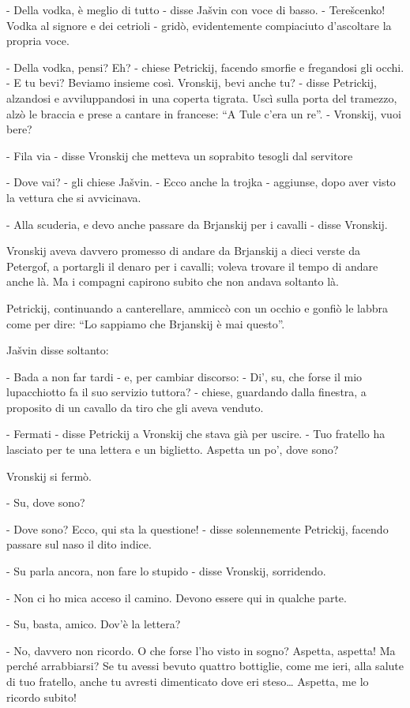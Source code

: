 - Della vodka, è meglio di tutto - disse Jašvin con voce di basso. - Terešcenko! Vodka al signore e dei cetrioli - gridò, evidentemente compiaciuto d'ascoltare la propria voce. 

- Della vodka, pensi? Eh? - chiese Petrickij, facendo smorfie e fregandosi gli occhi. - E tu bevi? Beviamo insieme così. Vronskij, bevi anche tu? - disse Petrickij, alzandosi e avviluppandosi in una coperta tigrata. Uscì sulla porta del tramezzo, alzò le braccia e prese a cantare in francese: ``A Tule c'era un re''. - Vronskij, vuoi bere? 

- Fila via - disse Vronskij che metteva un soprabito tesogli dal servitore 

- Dove vai? - gli chiese Jašvin. - Ecco anche la trojka - aggiunse, dopo aver visto la vettura che si avvicinava. 

- Alla scuderia, e devo anche passare da Brjanskij per i cavalli - disse Vronskij. 

Vronskij aveva davvero promesso di andare da Brjanskij a dieci verste da Petergof, a portargli il denaro per i cavalli; voleva trovare il tempo di andare anche là. Ma i compagni capirono subito che non andava soltanto là. 

Petrickij, continuando a canterellare, ammiccò con un occhio e gonfiò le labbra come per dire: ``Lo sappiamo che Brjanskij è mai questo''. 

Jašvin disse soltanto: 

- Bada a non far tardi - e, per cambiar discorso: - Di', su, che forse il mio lupacchiotto fa il suo servizio tuttora? - chiese, guardando dalla finestra, a proposito di un cavallo da tiro che gli aveva venduto. 

- Fermati - disse Petrickij a Vronskij che stava già per uscire. - Tuo fratello ha lasciato per te una lettera e un biglietto. Aspetta un po', dove sono? 

Vronskij si fermò. 

- Su, dove sono? 

- Dove sono? Ecco, qui sta la questione! - disse solennemente Petrickij, facendo passare sul naso il dito indice. 

- Su parla ancora, non fare lo stupido - disse Vronskij, sorridendo. 

- Non ci ho mica acceso il camino. Devono essere qui in qualche parte. 

- Su, basta, amico. Dov'è la lettera? 

- No, davvero non ricordo. O che forse l'ho visto in sogno? Aspetta, aspetta! Ma perché arrabbiarsi? Se tu avessi bevuto quattro bottiglie, come me ieri, alla salute di tuo fratello, anche tu avresti dimenticato dove eri steso\ldots{} Aspetta, me lo ricordo subito! 

